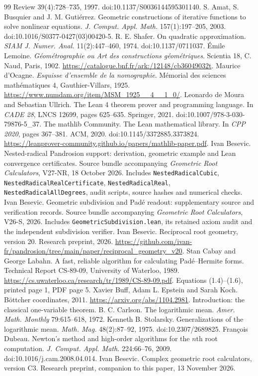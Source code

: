 \begin{thebibliography}{99}
{Review} 39(4):728--735, 1997. doi:10.1137/S0036144595301140.
 S. Amat, S. Busquier and J. M. Guti\'errez. Geometric constructions of iterative
functions to solve nonlinear equations. \emph{J. Comput. Appl. Math.} 157(1):197--205, 2003.
doi:10.1016/S0377-0427(03)00420-5.
 R. E. Shafer. On quadratic approximation. \emph{SIAM J. Numer. Anal.}
11(2):447--460, 1974. doi:10.1137/0711037.
 \'Emile Lemoine. \emph{G\'eom\'etrographie ou Art des constructions
g\'eom\'etriques}. Scientia 18, C. Naud, Paris, 1902.
\url{https://catalogue.bnf.fr/ark:/12148/cb36049032t}.
 Maurice d'Ocagne. \emph{Esquisse d'ensemble de la nomographie}. M\'emorial des
sciences math\'ematiques 4, Gauthier-Villars, 1925.
\url{https://www.numdam.org/item/MSM_1925__4__1_0/}.
 Leonardo de Moura and Sebastian Ullrich. The Lean 4 theorem prover and programming
language. In \emph{CADE 28}, LNCS 12699, pages 625--635. Springer, 2021.
doi:10.1007/978-3-030-79876-5\_37.
 The mathlib Community. The Lean mathematical library. In \emph{CPP 2020}, pages
367--381. ACM, 2020. doi:10.1145/3372885.3373824.
\url{https://leanprover-community.github.io/papers/mathlib-paper.pdf}.
 Ivan Besevic. Nested-radical Pandrosion support: derivation, geometric example and
Lean convergence certificates. Source bundle accompanying \emph{Geometric Root Calculators}, V27-NR,
18 October 2026. Includes \texttt{NestedRadicalCubic}, \texttt{NestedRadicalRealCertificate},
\texttt{NestedRadicalReal}, \texttt{NestedRadicalAllDegrees}, audit scripts, source hashes and
numerical checks.
 Ivan Besevic. Geometric subdivision and Pad\'e readout: supplementary source and
verification records. Source bundle accompanying \emph{Geometric Root Calculators}, V26-S, 2026.
Includes \texttt{GeometricSubdivision.lean}, its retained axiom audit and the independent subdivision
verifier.
 Ivan Besevic. Reciprocal root geometry, version 20. Research preprint, 2026.
\url{https://github.com/ivan-fr/pandrosion/tree/main/paper/reciprocal_geometry_v20}.
 Stan Cabay and George Labahn. A fast, reliable algorithm for calculating
Pad\'e--Hermite forms. Technical Report CS-89-09, University of Waterloo, 1989.
\url{https://cs.uwaterloo.ca/research/tr/1989/CS-89-09.pdf}. Equations (1.4)--(1.6), printed page 1,
PDF page 5.
 Xavier Buff, Adam L. Epstein and Sarah Koch. B\"ottcher coordinates, 2011.
\url{https://arxiv.org/abs/1104.2981}. Introduction: the classical one-variable theorem.
 B. C. Carlson. The logarithmic mean. \emph{Amer. Math. Monthly} 79:615--618, 1972.
 Kenneth B. Stolarsky. Generalizations of the logarithmic mean. \emph{Math. Mag.}
48(2):87--92, 1975. doi:10.2307/2689825.
 Fran\c{c}ois Dubeau. Newton's method and high-order algorithms for the $n$th root
computation. \emph{J. Comput. Appl. Math.} 224:66--76, 2009. doi:10.1016/j.cam.2008.04.014.
 Ivan Besevic. Complex geometric root calculators, version C3. Research preprint,
companion to this paper, 13 November 2026.
\end{thebibliography}
